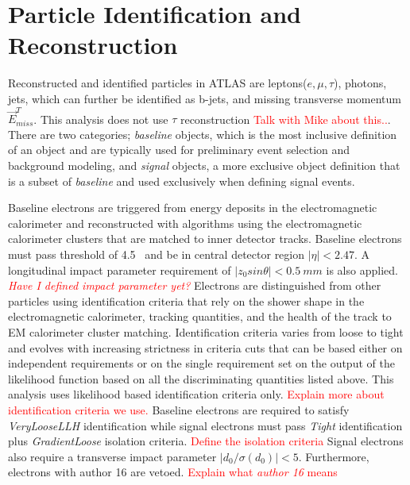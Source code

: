 \section{Particle Identification and Reconstruction}

Reconstructed and identified particles in ATLAS are leptons($e, \mu, \tau$), photons, jets, which can further be identified as b-jets, and missing transverse momentum $\vec{E}^T_{miss}$.  This analysis does not use $\tau$ reconstruction \textcolor{red}{Talk with Mike about this..}. There are two categories; \textit{baseline} objects, which is the most inclusive definition of an object and are typically used for preliminary event selection and background modeling, and \textit{signal} objects, a more exclusive object definition that is a subset of \textit{baseline} and used exclusively when defining signal events. 

Baseline electrons are triggered from energy deposits in the electromagnetic calorimeter and reconstructed with algorithms using the electromagnetic calorimeter clusters that are matched to inner detector tracks.  Baseline electrons must pass \pt{} threshold of 4.5 ~\GeV and be in central detector region $|\eta | < 2.47$.  A longitudinal impact parameter requirement of $|z_0sin\theta| < 0.5~mm$ is also applied. \textcolor{red}{\textit{Have I defined impact parameter yet?}} Electrons are distinguished from other particles using identification criteria that rely on the shower shape in the electromagnetic calorimeter, tracking quantities, and the health of the track to EM calorimeter cluster matching.  Identification criteria varies from loose to tight and evolves with increasing strictness in criteria cuts that can be based either on independent requirements or on the single requirement set on the output of the likelihood function based on all the discriminating quantities listed above.  This analysis uses likelihood based identification criteria only.  \textcolor{red}{Explain more about identification criteria we use.}  Baseline electrons are required to satisfy \textit{VeryLooseLLH} identification while signal electrons must pass \textit{Tight} identification plus \textit{GradientLoose} isolation criteria. \textcolor{red}{Define the isolation criteria}  Signal electrons also require a transverse impact parameter $|d_0/\sigma(d_0)| < 5$. Furthermore, electrons with author 16 are vetoed.  \textcolor{red}{Explain what \textit{author 16} means}

